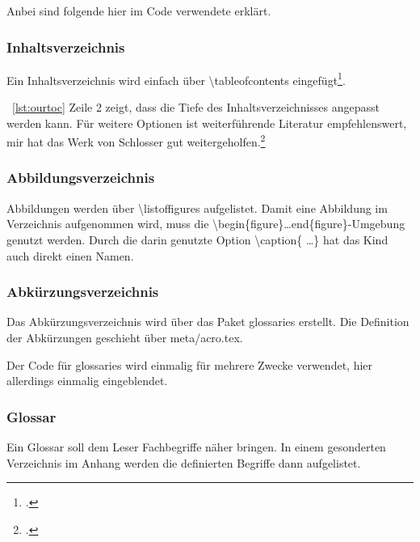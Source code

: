 
Anbei sind folgende hier im Code verwendete erklärt.
\subsubsection{Inhaltsverzeichnis}%
\label{sec:toc}
Ein Inhaltsverzeichnis wird einfach über \textbackslash tableofcontents eingefügt\footcite[Vgl. ][S. 7ff]{ochsner_textverarbeitungssystem_2015}.



~\ref{lst:ourtoc} Zeile 2 zeigt, dass die Tiefe des Inhaltsverzeichnisses angepasst werden kann. Für weitere Optionen ist weiterführende Literatur empfehlenswert, mir hat das Werk von Schlosser gut weitergeholfen.\footcite[Vgl. ][S. 207ff.]{schlosser_wissenschaftliche_2014}%
\subsubsection{Abbildungsverzeichnis}%
\label{sec:lof}
Abbildungen werden über \textbackslash listoffigures aufgelistet. Damit eine Abbildung im Verzeichnis aufgenommen wird, muss die \textbackslash begin\{figure\}\ldots end\{figure\}-Umgebung genutzt werden. Durch die darin genutzte Option \textbackslash caption\{ \ldots \} hat das Kind auch direkt einen Namen.
\subsubsection{Abkürzungsverzeichnis}%
\label{sec:acros}
Das Abkürzungsverzeichnis wird über das Paket glossaries erstellt. Die Definition der Abkürzungen geschieht über meta/acro.tex.

Der Code für glossaries wird einmalig für mehrere Zwecke verwendet, hier allerdings einmalig eingeblendet.


\subsubsection{Glossar}%
\label{sec:glossaries}
Ein Glossar soll dem Leser Fachbegriffe näher bringen. In einem gesonderten Verzeichnis im Anhang werden die definierten Begriffe dann aufgelistet.

